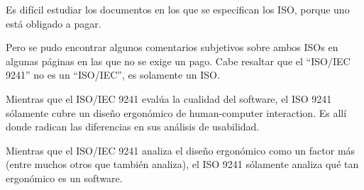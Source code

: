Es difícil estudiar los documentos en los que se especifican los ISO, porque uno está obligado a pagar.

Pero se pudo encontrar algunos comentarios subjetivos sobre ambos ISOs en algunas páginas en las que no se exige un pago. Cabe resaltar que el ``ISO/IEC 9241'' no es un ``ISO/IEC'', es solamente un ISO.

Mientras que el ISO/IEC 9241 evalúa la cualidad del software, el ISO 9241 sólamente cubre un diseño ergonómico de human-computer interaction. Es allí donde radican las diferencias en sus análisis de usabilidad.

Mientras que el ISO/IEC 9241 analiza el diseño ergonómico como un factor más (entre muchos otros que también analiza), el ISO 9241 sólamente analiza qué tan ergonómico es un software.
